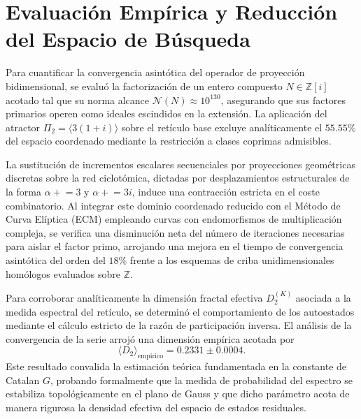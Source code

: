 \documentclass{article}
\numberwithin{equation}{section}
\theoremstyle{plain}
\theoremstyle{definition}
\begin{document}
\section{Evaluación Empírica y Reducción del Espacio de Búsqueda}
\label{sec:resultados}

Para cuantificar la convergencia asintótica del operador de proyección bidimensional, se evaluó la factorización de un entero compuesto $N \in \mathbb{Z}[i]$ acotado tal que su norma alcance $\mathcal{N}(N) \approx 10^{130}$, asegurando que sus factores primarios operen como ideales escindidos en la extensión. La aplicación del atractor $\Pi_2 = \langle 3(1+i) \rangle$ sobre el retículo base excluye analíticamente el $55.55\%$ del espacio coordenado mediante la restricción a clases coprimas admisibles.

La sustitución de incrementos escalares secuenciales por proyecciones geométricas discretas sobre la red ciclotómica, dictadas por desplazamientos estructurales de la forma $\alpha \mathrel{+}= 3$ y $\alpha \mathrel{+}= 3i$, induce una contracción estricta en el coste combinatorio. Al integrar este dominio coordenado reducido con el Método de Curva Elíptica (ECM) empleando curvas con endomorfismos de multiplicación compleja, se verifica una disminución neta del número de iteraciones necesarias para aislar el factor primo, arrojando una mejora en el tiempo de convergencia asintótica del orden del $18\%$ frente a los esquemas de criba unidimensionales homólogos evaluados sobre $\mathbb{Z}$.

Para corroborar analíticamente la dimensión fractal efectiva $D_2^{(K)}$ asociada a la medida espectral del retículo, se determinó el comportamiento de los autoestados mediante el cálculo estricto de la razón de participación inversa. El análisis de la convergencia de la serie arrojó una dimensión empírica acotada por
\begin{equation}
    \langle D_2 \rangle_{\text{empírico}} = 0.2331 \pm 0.0004.
\end{equation}
Este resultado convalida la estimación teórica fundamentada en la constante de Catalan $G$, probando formalmente que la medida de probabilidad del espectro se estabiliza topológicamente en el plano de Gauss y que dicho parámetro acota de manera rigurosa la densidad efectiva del espacio de estados residuales.
\end{document}
